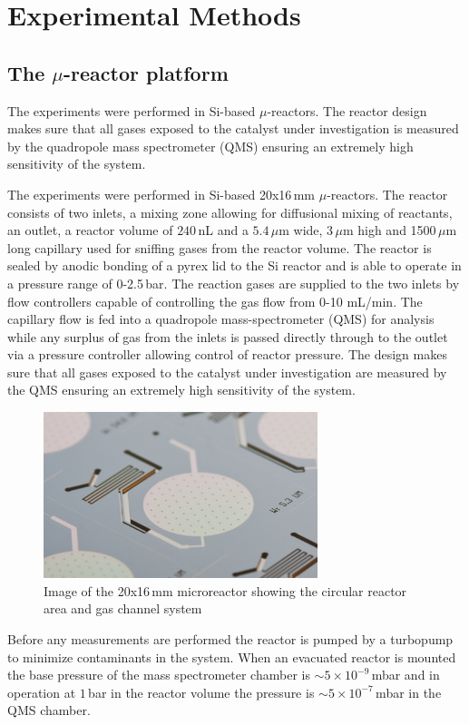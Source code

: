 \documentclass[8.5pt,twoside,twocolumn]{article}
\begin{document}
\section{Experimental Methods}
\subsection{The $\mu$-reactor platform}
The experiments were performed in Si-based $\mu$-reactors\cite{Henriksen2009}. The reactor design makes sure that all gases exposed to the catalyst under investigation is measured by the quadropole mass spectrometer (QMS) ensuring an extremely high sensitivity of the system. 

The experiments were performed in Si-based 20x16\,mm $\mu$-reactors\cite{Henriksen2009}. The reactor consists of two inlets, a mixing zone allowing for diffusional mixing of reactants, an outlet, a reactor volume of $240\,$nL and a $5.4\,\mu$m wide, 3\,$\mu$m high and 1500\,$\mu$m long capillary used for sniffing gases from the reactor volume. The reactor is sealed by anodic bonding of a pyrex lid to the Si reactor and is able to operate in a pressure range of 0-2.5\,bar. The reaction gases are supplied to the two inlets by flow controllers capable of controlling the gas flow from 0-10 mL/min. The capillary flow is fed into a quadropole mass-spectrometer (QMS) for analysis while any surplus of gas from the inlets is passed directly through to the outlet via a pressure controller allowing control of reactor pressure. The design makes sure that all gases exposed to the catalyst under investigation are measured by the QMS ensuring an extremely high sensitivity of the system. 

\begin{figure}[h]
  \centering
  \includegraphics[width=8cm]{reactor.jpg}
  \caption{Image of the 20x16\,mm microreactor showing the circular reactor area and gas channel system}
  \label{fgr:reactor}
\end{figure}


Before any measurements are performed the reactor is pumped by a turbopump to minimize contaminants in the system. When an evacuated reactor is mounted the base pressure of the mass spectrometer chamber is $\sim5\times10^{-9}\,$mbar and in operation at $1\,$bar in the reactor volume the pressure is $\sim5\times10^{-7}\,$mbar in the QMS chamber. 
\end{document}
